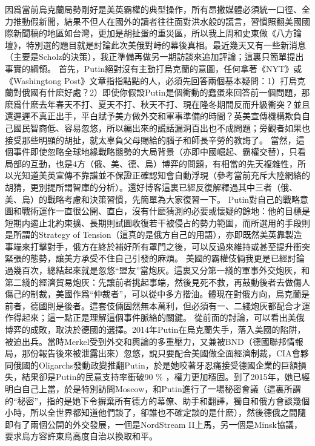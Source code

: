 \documentclass[twocolumn]{ctexart}
\begin{document}
因爲當前烏克蘭局勢剛好是美英霸權的典型操作，所有昂撒媒體必須統一口徑、全力推動假新聞，結果不但人在國外的讀者往往面對洪水般的謊言，習慣照翻美國國際新聞稿的地區如台灣，更加是胡扯蛋的重災區，所以我上周和史東做《八方論壇》，特別選的題目就是討論此次美俄對峙的幕後真相。最近幾天又有一些新消息（主要是Scholz的決策），我正準備再做另一期訪談來追加評論；這裏只簡單提出事實的綱領。
首先，Putin絕對沒有主動打烏克蘭的意圖，任何拿著《NYT》或《Washingtong Post》文章指指點點的人，必須先回答兩個基本疑問：1）打烏克蘭對俄國有什麽好處？2）即使你假設Putin是個衝動的蠢蛋來回答前一個問題，那麽爲什麽去年春天不打、夏天不打、秋天不打、現在隆冬期間反而升級衝突？並且還遲遲不真正出手，平白賦予美方做外交和軍事準備的時間？英美宣傳機構欺負自己國民智商低、容易忽悠，所以編出來的謊話漏洞百出也不成問題；旁觀者如果也接受那些明顯的胡扯，就太辜負父母賜給的腦子和師長辛勞的教誨了。
當然，這個事件即使忽略全球地緣戰略態勢的大局背景（亦即中國崛起、霸權交替），只看局部的互動，也是4方（俄、美、德、烏）博弈的問題，有相當的先天複雜性，所以光知道美英宣傳不靠譜並不保證正確認知會自動浮現（參考當前充斥大陸網絡的胡猜，更別提所謂智庫的分析）。還好博客這裏已經反復解釋過其中三者（俄、美、烏）的戰略考慮和決策習慣，先簡單為大家復習一下。
Putin對自己的戰略意圖和戰術運作一直很公開、直白，沒有什麽猜測的必要或懷疑的餘地：他的目標是短期内遏止北約東擴、長期則試圖收復若干被侵占的勢力範圍，而所選用的手段則是所謂的Strategy of Tension（這真的是俄方自己的用語），亦即既然美英靠製造事端來打擊對手，俄方在終於補好所有罩門之後，可以反過來維持或甚至提升衝突緊張的態勢，讓美方承受不住自己引發的麻煩。
美國的霸權伎倆我更是已經討論過幾百次，總結起來就是忽悠“盟友”當炮灰。這裏又分第一綫的軍事外交炮灰，和第二綫的經濟貿易炮灰：先讓前者挑起事端，然後見死不救，再鼓動後者去做傷人傷己的制裁，美國作爲“仲裁者”，可以從中多方揩油。體現在對俄方向，烏克蘭是前者，德國則是後者。這套伎倆固然無本萬利，但必須有一、二綫炮灰都配合才運作得起來；這一點正是理解這個事件脈絡的關鍵。
從前面的討論，可以看出美俄博弈的成敗，取決於德國的選擇。2014年Putin在烏克蘭失手，落入美國的陷阱，被迫出兵。當時Merkel受到外交和輿論的多重壓力，又兼被BND（德國聯邦情報局，那份報告後來被泄露出來）忽悠，說只要配合美國做全面經濟制裁，CIA會夥同俄國的Oligarchs發動政變推翻Putin，於是她咬著牙忍痛接受德國企業的巨額損失，結果卻是Putin的民意支持率衝破90 \% ，權力更加穩固。到了2015年，她已經明白自己上當，於是特別訪問Moscow，和Putin進行了一場秘密會議（這裏所謂的“秘密”，指的是她下令摒棄所有德方的幕僚、助手和翻譯，獨自和俄方會談幾個小時，所以全世界都知道他們談了，卻誰也不確定談的是什麽），然後德俄之間隨即有了兩個公開的外交發展，一個是NordStream II上馬，另一個是Minsk協議，要求烏方容許東烏高度自治以換取和平。
\end{document}
